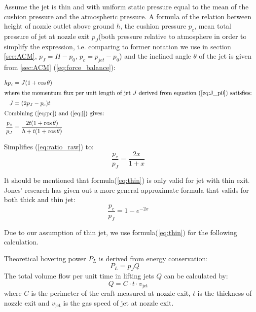 Assume the jet is thin and with uniform static pressure equal to the mean of the cushion 
pressure and the atmospheric pressure. A formula of the relation between height of nozzle outlet above ground $h$, the cushion pressure $p_c$, mean total pressure of jet at nozzle exit $p_J$(both pressure relative to atmosphere in order to simplify the expression, i.e. comparing to former notation we use in section \ref{sec:ACM}, $p_J=H-p_0$, $p_c=p_{jet} -p_0$) and the inclined angle $\theta$ of the jet is given from \ref{sec:ACM} (\ref{eq:force_balance}):


\begin{align}
    h p_c &= J (1 + \cos\theta) \label{eq:pc} \\
    \intertext{where the momentum flux per unit length of jet $J$ derived from equation (\ref{eq:J_p0}) satisfies:}
    J &= (2p_J - p_c)t \label{eq:j} \\
    \intertext{Combining (\ref{eq:pc}) and (\ref{eq:j}) gives:} 
    \frac{p_c}{p_J} &= \frac{2t(1 + \cos\theta)}{h + t(1 + \cos\theta)} \label{eq:ratio_raw}
\end{align}



Simplifies (\ref{eq:ratio_raw}) to:
\begin{equation}
    \frac{p_c}{p_J} = \frac{2x}{1 + x}  \label{eq:thin}
\end{equation}

It should be mentioned that formula(\ref{eq:thin}) is only valid for jet with thin exit. Jones' research \cite{jones1961design} has given out a more general approximate formula that valids for both thick and thin jet:
\begin{equation}
    \frac{p_c}{p_J} = 1 - e^{-2x}  \label{eq:thick}
\end{equation}



Due to our assumption of thin jet, we use formula(\ref{eq:thin}) for the following calculation.

Theoretical hovering power $P_L$ is derived from energy conservation:
\begin{equation}
    P_L = p_J Q \quad 
\end{equation}
The total volume flow per unit time in lifting jets $Q$ can be calculated by:
\begin{equation}
    Q = C \cdot t \cdot v_{\text{jet}}  
\end{equation}
where $C$ is the perimeter of the craft measured at nozzle exit, $t$ is the thickness of nozzle exit and $v_{\text{jet}}$ is the gas speed of jet at nozzle exit.

